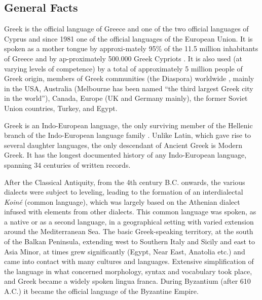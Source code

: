 \clearpage


\begin{multicols}{2}

\subsection{General Facts}

Greek is the official language of Greece and one of the two official languages of Cyprus and since 1981 one of the official languages of the European Union. It is spoken as a mother tongue by approxi-mately 95\% of the 11.5 million inhabitants of Greece and by ap-proximately 500.000 Greek Cypriots \cite{Stat1}. It is also used (at varying levels of competence) by a total of approximately 5 million people of Greek origin, members of Greek communities (the Diaspora) worldwide  \cite{Dias1}, mainly in the USA, Australia (Melbourne has been named “the third largest Greek city in the world”), Canada, Europe (UK and Germany mainly), the former Soviet Union countries, Turkey, and Egypt. 

Greek is an Indo-European language, the only surviving member of the Hellenic branch of the Indo-European language family \cite{Trud1}. Unlike Latin, which gave rise to several daughter languages, the only descendant of Ancient Greek is Modern Greek. It has the longest documented history of any Indo-European language, spanning 34 centuries of written records.

After the Classical Antiquity, from the 4th century B.C. onwards, the various dialects were subject to leveling, leading to the formation of an interdialectal \textit{Koiné} (common language), which was largely based on the Athenian dialect infused with elements from other dialects. This common language was spoken, as a native or as a second language, in a geographical setting with varied extension around the Mediterranean Sea. The basic Greek-speaking territory, at the south of the Balkan Peninsula, extending west to Southern Italy and Sicily and east to Asia Minor, at times grew significantly (Egypt, Near East, Anatolia etc.) and came into contact with many cultures and languages. Extensive simplification of the language in what concerned morphology, syntax and vocabulary took place, and Greek became a widely spoken lingua franca. During Byzantium (after 610 A.C.) it became the official language of the Byzantine Empire.


\end{multicols}
